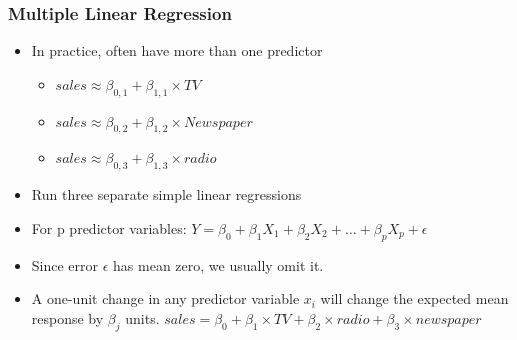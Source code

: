 




\begin{frame}[fragile]\frametitle{Multiple Linear Regression}
\begin{itemize}
\item In practice, often have more than one predictor
\begin{itemize}
\item $sales \approx \beta_{0,1} + \beta_{1,1} \times TV$
\item $sales \approx \beta_{0,2} + \beta_{1,2} \times Newspaper$
\item $sales \approx \beta_{0,3} + \beta_{1,3} \times radio$
\end{itemize}
\item Run three separate simple linear regressions
\item For p predictor variables:
$ Y = \beta_0 + \beta_1 X_1 + \beta_2 X_2 + \ldots + \beta_p X_p + \epsilon$
\item Since error $\epsilon$ has mean zero, we usually omit it.
\item A one-unit change in any predictor variable $x_i$ will change the expected mean response by $\beta_j$ units. 
$ sales = \beta_0 + \beta_1 \times TV + \beta_2 \times radio + \beta_3 \times newspaper$
\end{itemize}
\end{frame}


